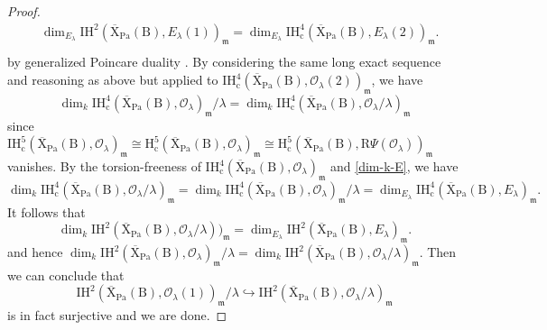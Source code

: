 \documentclass[10pt]{amsart}
\numberwithin{equation}{section}
\theoremstyle{definition}
\def\Pa{\mathrm{Pa}}
\def\IH{\mathrm{IH}}
\def\calO{\mathcal{O}}
\def\fracm{\mathfrak{m}}
\def\rmc{\mathrm{c}}
\def\rmB{\mathrm{B}}
\def\rmH{\mathrm{H}}
\def\rmR{\mathrm{R}}
\def\rmX{\mathrm{X}}
\begin{document}
\begin{proof}
\begin{equation*}
\begin{aligned}
&\dim_{E_{\lambda}} \IH^{2}(\overline{\rmX}_{\Pa}(\rmB), E_{\lambda}(1))_{\fracm}=\dim_{E_{\lambda}} \IH^{4}_{\rmc}(\overline{\rmX}_{\Pa}(\rmB), E_{\lambda}(2))_{\fracm}.\\
\end{aligned}
\end{equation*}
by generalized Poincare duality \cite[Proposition 2.1.17]{BBD}.  By considering the same long exact sequence and reasoning as above but applied to $\IH^{4}_{\rmc}(\overline{\rmX}_{\Pa}(\rmB), \calO_{\lambda}(2))_{\fracm}$, we have
\begin{equation}\label{dim-k-E}
\dim_{k} \IH^{4}_{\rmc}(\overline{\rmX}_{\Pa}(\rmB), \calO_{\lambda})_{\fracm}/\lambda=\dim_{k} \IH^{4}_{\rmc}(\overline{\rmX}_{\Pa}(\rmB), \calO_{\lambda}/\lambda)_{\fracm}
\end{equation}
since $\IH^{5}_{\rmc}(\overline{\rmX}_{\Pa}(\rmB), \calO_{\lambda})_{\fracm}\cong \rmH^{5}_{\rmc}(\overline{\rmX}_{\Pa}(\rmB), \calO_{\lambda})_{\fracm}\cong \rmH^{5}_{\rmc}(\overline{\rmX}_{\Pa}(\rmB), \rmR\Psi(\calO_{\lambda}))_{\fracm}$
vanishes. By the torsion-freeness of $\IH^{4}_{\rmc}(\overline{\rmX}_{\Pa}(\rmB), \calO_{\lambda})_{\fracm}$ and \eqref{dim-k-E}, we have 
\begin{equation*}
\dim_{k} \IH^{4}_{\rmc}(\overline{\rmX}_{\Pa}(\rmB), \calO_{\lambda}/\lambda)_{\fracm}=\dim_{k} \IH^{4}_{\rmc}(\overline{\rmX}_{\Pa}(\rmB), \calO_{\lambda})_{\fracm}/\lambda=\dim_{E_{\lambda}} \IH^{4}_{\rmc}(\overline{\rmX}_{\Pa}(\rmB), E_{\lambda})_{\fracm}.
\end{equation*}
It follows that 
\begin{equation*}
\dim_{k} \IH^{2}(\overline{\rmX}_{\Pa}(\rmB), \calO_{\lambda}/\lambda))_{\fracm}=\dim_{E_{\lambda}} \IH^{2}(\overline{\rmX}_{\Pa}(\rmB), E_{\lambda})_{\fracm}.
\end{equation*}
and hence $\dim_{k} \IH^{2}(\overline{\rmX}_{\Pa}(\rmB), \calO_{\lambda})_{\fracm}/\lambda=\dim_{k} \IH^{2}(\overline{\rmX}_{\Pa}(\rmB), \calO_{\lambda}/\lambda)_{\fracm}$. Then we can conclude that
\begin{equation*}
\IH^{2}(\overline{\rmX}_{\Pa}(\rmB), \calO_{\lambda}(1))_{\fracm}/\lambda\hookrightarrow \IH^{2}(\overline{\rmX}_{\Pa}(\rmB), \calO_{\lambda}/\lambda)_{\fracm} 
\end{equation*}
is in fact surjective and we are done.
\end{proof}
\end{document}
